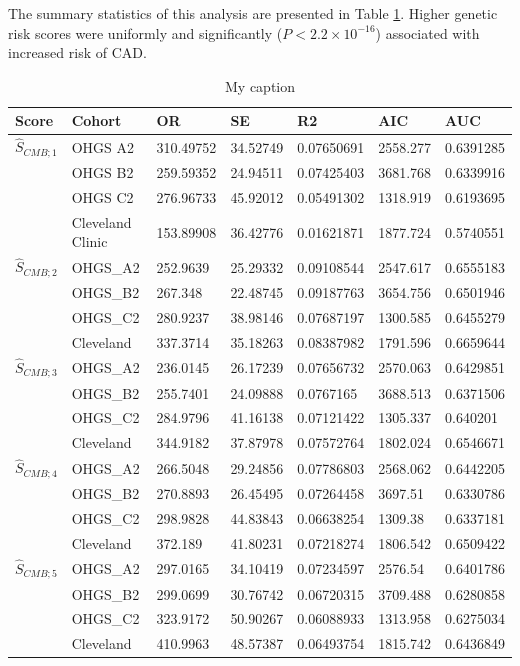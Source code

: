 The summary statistics of this analysis are presented in Table \ref{cmd-sum}. Higher genetic risk scores were uniformly and significantly ($P < 2.2 \times 10^{-16}$) associated with increased risk of \ac{CAD}.

\begin{table}[H]
\centering
\caption{My caption}
\label{cmd-sum}
\begin{tabular}{lllllll}
\hline
Score & Cohort           & OR        & SE       & R2         & AIC      & AUC       \\ \hline
$\hat{S}_{CMB; 1}$     & OHGS A2          & 310.49752 & 34.52749 & 0.07650691 & 2558.277 & 0.6391285 \\
      & OHGS B2          & 259.59352 & 24.94511 & 0.07425403 & 3681.768 & 0.6339916 \\
      & OHGS C2          & 276.96733 & 45.92012 & 0.05491302 & 1318.919 & 0.6193695 \\
      & Cleveland Clinic & 153.89908 & 36.42776 & 0.01621871 & 1877.724 & 0.5740551 \\ \hline
$\hat{S}_{CMB; 2}$     & OHGS\_A2         & 252.9639  & 25.29332 & 0.09108544 & 2547.617 & 0.6555183 \\
      & OHGS\_B2         & 267.348   & 22.48745 & 0.09187763 & 3654.756 & 0.6501946 \\
      & OHGS\_C2         & 280.9237  & 38.98146 & 0.07687197 & 1300.585 & 0.6455279 \\
      & Cleveland        & 337.3714  & 35.18263 & 0.08387982 & 1791.596 & 0.6659644 \\ \hline
$\hat{S}_{CMB; 3}$     & OHGS\_A2         & 236.0145  & 26.17239 & 0.07656732 & 2570.063 & 0.6429851 \\
      & OHGS\_B2         & 255.7401  & 24.09888 & 0.0767165  & 3688.513 & 0.6371506 \\
      & OHGS\_C2         & 284.9796  & 41.16138 & 0.07121422 & 1305.337 & 0.640201  \\
      & Cleveland        & 344.9182  & 37.87978 & 0.07572764 & 1802.024 & 0.6546671 \\ \hline
$\hat{S}_{CMB; 4}$     & OHGS\_A2         & 266.5048  & 29.24856 & 0.07786803 & 2568.062 & 0.6442205 \\
      & OHGS\_B2         & 270.8893  & 26.45495 & 0.07264458 & 3697.51  & 0.6330786 \\
      & OHGS\_C2         & 298.9828  & 44.83843 & 0.06638254 & 1309.38  & 0.6337181 \\
      & Cleveland        & 372.189   & 41.80231 & 0.07218274 & 1806.542 & 0.6509422 \\ \hline
$\hat{S}_{CMB; 5}$     & OHGS\_A2         & 297.0165  & 34.10419 & 0.07234597 & 2576.54  & 0.6401786 \\
      & OHGS\_B2         & 299.0699  & 30.76742 & 0.06720315 & 3709.488 & 0.6280858 \\
      & OHGS\_C2         & 323.9172  & 50.90267 & 0.06088933 & 1313.958 & 0.6275034 \\
      & Cleveland        & 410.9963  & 48.57387 & 0.06493754 & 1815.742 & 0.6436849 \\ \hline
\end{tabular}
\end{table}

